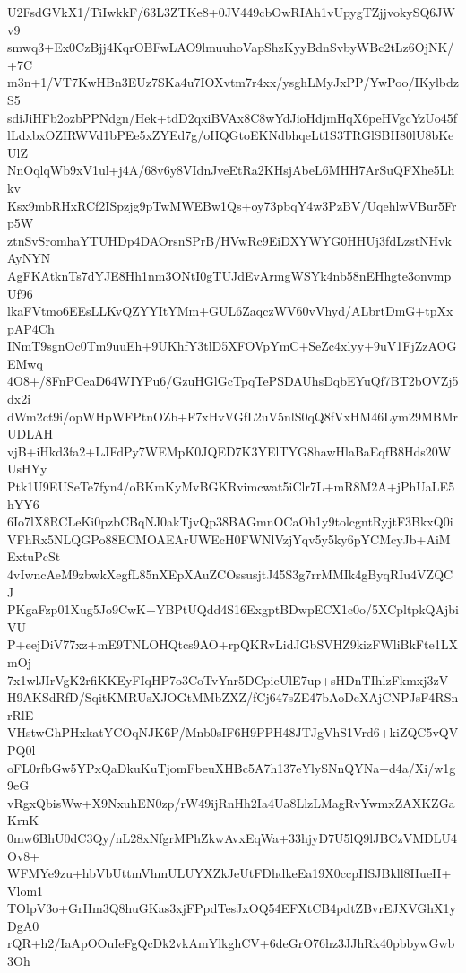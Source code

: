 U2FsdGVkX1/TiIwkkF/63L3ZTKe8+0JV449cbOwRIAh1vUpygTZjjvokySQ6JWv9
smwq3+Ex0CzBjj4KqrOBFwLAO9lmuuhoVapShzKyyBdnSvbyWBc2tLz6OjNK/+7C
m3n+1/VT7KwHBn3EUz7SKa4u7IOXvtm7r4xx/ysghLMyJxPP/YwPoo/IKylbdzS5
sdiJiHFb2ozbPPNdgn/Hek+tdD2qxiBVAx8C8wYdJioHdjmHqX6peHVgcYzUo45f
lLdxbxOZIRWVd1bPEe5xZYEd7g/oHQGtoEKNdbhqeLt1S3TRGlSBH80lU8bKeUlZ
NnOqlqWb9xV1ul+j4A/68v6y8VIdnJveEtRa2KHsjAbeL6MHH7ArSuQFXhe5Lhkv
Ksx9mbRHxRCf2ISpzjg9pTwMWEBw1Qs+oy73pbqY4w3PzBV/UqehlwVBur5Frp5W
ztnSvSromhaYTUHDp4DAOrsnSPrB/HVwRc9EiDXYWYG0HHUj3fdLzstNHvkAyNYN
AgFKAtknTs7dYJE8Hh1nm3ONtI0gTUJdEvArmgWSYk4nb58nEHhgte3onvmpUf96
lkaFVtmo6EEsLLKvQZYYItYMm+GUL6ZaqczWV60vVhyd/ALbrtDmG+tpXxpAP4Ch
INmT9sgnOc0Tm9uuEh+9UKhfY3tlD5XFOVpYmC+SeZc4xlyy+9uV1FjZzAOGEMwq
4O8+/8FnPCeaD64WIYPu6/GzuHGlGcTpqTePSDAUhsDqbEYuQf7BT2bOVZj5dx2i
dWm2ct9i/opWHpWFPtnOZb+F7xHvVGfL2uV5nlS0qQ8fVxHM46Lym29MBMrUDLAH
vjB+iHkd3fa2+LJFdPy7WEMpK0JQED7K3YElTYG8hawHlaBaEqfB8Hds20WUsHYy
Ptk1U9EUSeTe7fyn4/oBKmKyMvBGKRvimcwat5iClr7L+mR8M2A+jPhUaLE5hYY6
6Io7lX8RCLeKi0pzbCBqNJ0akTjvQp38BAGmnOCaOh1y9tolcgntRyjtF3BkxQ0i
VFhRx5NLQGPo88ECMOAEArUWEcH0FWNlVzjYqv5y5ky6pYCMcyJb+AiMExtuPcSt
4vIwncAeM9zbwkXegfL85nXEpXAuZCOssusjtJ45S3g7rrMMIk4gByqRIu4VZQCJ
PKgaFzp01Xug5Jo9CwK+YBPtUQdd4S16ExgptBDwpECX1c0o/5XCpltpkQAjbiVU
P+eejDiV77xz+mE9TNLOHQtcs9AO+rpQKRvLidJGbSVHZ9kizFWliBkFte1LXmOj
7x1wlJIrVgK2rfiKKEyFIqHP7o3CoTvYnr5DCpieUlE7up+sHDnTIhlzFkmxj3zV
H9AKSdRfD/SqitKMRUsXJOGtMMbZXZ/fCj647sZE47bAoDeXAjCNPJsF4RSnrRlE
VHstwGhPHxkatYCOqNJK6P/Mnb0sIF6H9PPH48JTJgVhS1Vrd6+kiZQC5vQVPQ0l
oFL0rfbGw5YPxQaDkuKuTjomFbeuXHBc5A7h137eYlySNnQYNa+d4a/Xi/w1g9eG
vRgxQbisWw+X9NxuhEN0zp/rW49ijRnHh2Ia4Ua8LlzLMagRvYwmxZAXKZGaKrnK
0mw6BhU0dC3Qy/nL28xNfgrMPhZkwAvxEqWa+33hjyD7U5lQ9lJBCzVMDLU4Ov8+
WFMYe9zu+hbVbUttmVhmULUYXZkJeUtFDhdkeEa19X0ccpHSJBkll8HueH+Vlom1
TOlpV3o+GrHm3Q8huGKas3xjFPpdTesJxOQ54EFXtCB4pdtZBvrEJXVGhX1yDgA0
rQR+h2/IaApOOuIeFgQcDk2vkAmYlkghCV+6deGrO76hz3JJhRk40pbbywGwb3Oh
